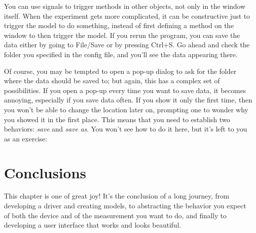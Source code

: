 
You can use signals to trigger methods in other objects, not only in the window itself. When the experiment gets more complicated, it can be constructive just to trigger the model to do something, instead of first defining a method on the window to then trigger the model. If you rerun the program, you can save the data either by going to File/Save or by pressing Ctrl+S. Go ahead and check the folder you specified in the config file, and you'll see the data appearing there.


Of course, you may be tempted to open a pop-up dialog to ask for the folder where the data should be saved to; but again, this has a complex set of possibilities. If you open a pop-up every time you want to save data, it becomes annoying, especially if you save data often. If you show it only the first time, then you won't be able to change the location later on, prompting one to wonder why you showed it in the first place. This means that you need to establish two behaviors: \emph{save} and \emph{save as}. You won't see how to do it here, but it's left to you as an exercise:


\section{Conclusions}\label{sec:conclusions}
This chapter is one of great joy! It's the conclusion of a long journey, from developing a driver and creating models, to abstracting the behavior you expect of both the device and of the measurement you want to do, and finally to developing a user interface that works and looks beautiful.

